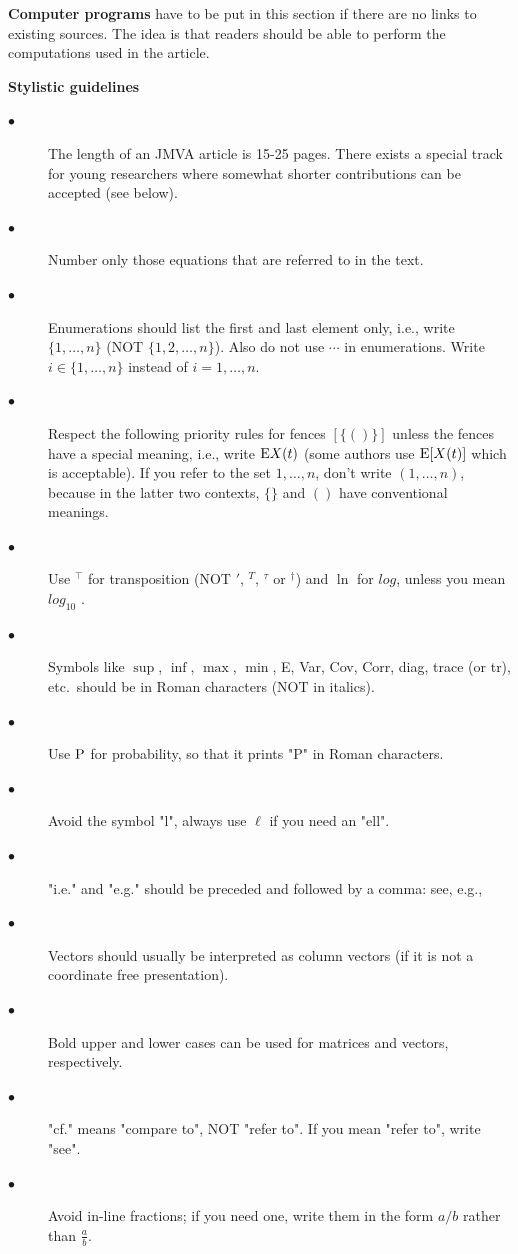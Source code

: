 \documentclass[a4paper,fleqn]{cas-sc} %
\begin{document}
\textbf{Computer programs} have to be put in this section if there are no links to existing sources. The idea is that readers should be able to perform the computations used in the article.

\newpage
\centerline{\Large{\textbf{Stylistic guidelines}}}

\noindent
\begin{description}
\item[$\bullet$] The length of an JMVA article is 15-25 pages. There exists a special track for young researchers where somewhat shorter contributions can be accepted (see below).
\item[$\bullet$]  Number only those equations that are referred to in the text.
\item[$\bullet$] Enumerations should list the first and last element only, i.e., write $\{1, \ldots, n\}$ (NOT $\{1, 2, \ldots , n\}$). Also do not use $\cdots$ in enumerations. Write $i\in\{1,\ldots, n\}$ instead of $i=1,\ldots, n$.
\item[$\bullet$] Respect the following priority rules for fences $[\{()\}]$ unless the fences have a special meaning, i.e., write $\mbox{${\rm E}$}{X(t)}$ (some authors use $\mbox{${\rm E}$}[X(t)]$ which is acceptable). If you refer to the set ${1,\ldots, n}$, don't write $(1,\ldots, n)$, because in the latter two contexts, $\{\}$ and $()$ have conventional meanings.
\item[$\bullet$] Use $^\top$ for transposition (NOT $'$, $^T$, $^\tau$ or $^\dagger$) and $\ln$ for $log$, unless you mean $log_{10}$ .
\item[$\bullet$] Symbols like $\sup$, $\inf$, $\max$, $\min$, E, Var, Cov, Corr, diag, trace (or tr), etc.~should be in Roman characters (NOT in italics).
\item[$\bullet$] Use ${\rm P}$ for probability, so that it prints "{\rm P}" in Roman characters.
\item[$\bullet$] Avoid the symbol "l", always use $\ell$ if you need an "ell".
\item[$\bullet$] "i.e." and "e.g." should be preceded and followed by a comma:  see, e.g.,
\item[$\bullet$] Vectors should usually be interpreted as column vectors (if it is not a coordinate free presentation).
\item[$\bullet$] Bold upper and lower cases can be used for matrices and vectors, respectively.
\item[$\bullet$] "cf." means "compare to", NOT "refer to". If you mean "refer to", write "see".
\item[$\bullet$] Avoid in-line fractions; if you need one, write them in the form $a/b$ rather than $\frac{a}{b}$.

\end{description}
\end{document}
